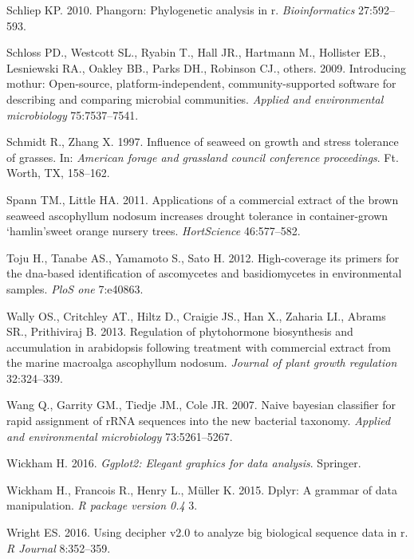 \documentclass[12pt,]{article}
\begin{document}
\hypertarget{ref-schliep2010phangorn}{}
Schliep KP. 2010. Phangorn: Phylogenetic analysis in r.
\emph{Bioinformatics} 27:592--593.

\hypertarget{ref-schloss2009introducing}{}
Schloss PD., Westcott SL., Ryabin T., Hall JR., Hartmann M., Hollister
EB., Lesniewski RA., Oakley BB., Parks DH., Robinson CJ., others. 2009.
Introducing mothur: Open-source, platform-independent,
community-supported software for describing and comparing microbial
communities. \emph{Applied and environmental microbiology}
75:7537--7541.

\hypertarget{ref-schmidt1997influence}{}
Schmidt R., Zhang X. 1997. Influence of seaweed on growth and stress
tolerance of grasses. In: \emph{American forage and grassland council
conference proceedings}. Ft. Worth, TX, 158--162.

\hypertarget{ref-spann2011applications}{}
Spann TM., Little HA. 2011. Applications of a commercial extract of the
brown seaweed ascophyllum nodosum increases drought tolerance in
container-grown `hamlin'sweet orange nursery trees. \emph{HortScience}
46:577--582.

\hypertarget{ref-toju2012high}{}
Toju H., Tanabe AS., Yamamoto S., Sato H. 2012. High-coverage its
primers for the dna-based identification of ascomycetes and
basidiomycetes in environmental samples. \emph{PloS one} 7:e40863.

\hypertarget{ref-wally2013regulation}{}
Wally OS., Critchley AT., Hiltz D., Craigie JS., Han X., Zaharia LI.,
Abrams SR., Prithiviraj B. 2013. Regulation of phytohormone biosynthesis
and accumulation in arabidopsis following treatment with commercial
extract from the marine macroalga ascophyllum nodosum. \emph{Journal of
plant growth regulation} 32:324--339.

\hypertarget{ref-wang2007naive}{}
Wang Q., Garrity GM., Tiedje JM., Cole JR. 2007. Naive bayesian
classifier for rapid assignment of rRNA sequences into the new bacterial
taxonomy. \emph{Applied and environmental microbiology} 73:5261--5267.

\hypertarget{ref-wickham2016ggplot2}{}
Wickham H. 2016. \emph{Ggplot2: Elegant graphics for data analysis}.
Springer.

\hypertarget{ref-wickham2015dplyr}{}
Wickham H., Francois R., Henry L., Müller K. 2015. Dplyr: A grammar of
data manipulation. \emph{R package version 0.4} 3.

\hypertarget{ref-wright2016using}{}
Wright ES. 2016. Using decipher v2.0 to analyze big biological sequence
data in r. \emph{R Journal} 8:352--359.




\newpage
\singlespacing 
\end{document}
